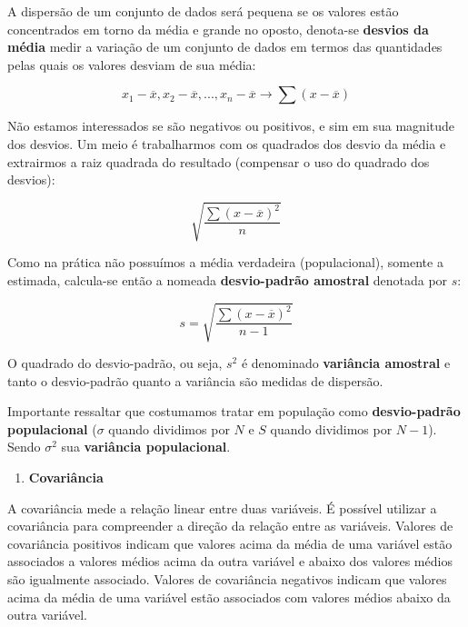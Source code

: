 \documentclass[
  openany]{book}
\providecommand{\tightlist}{%
  \setlength{\itemsep}{0pt}\setlength{\parskip}{0pt}}
\begin{document}
A dispersão de um conjunto de dados será pequena se os valores estão concentrados em torno da média e grande no oposto, denota-se \textbf{desvios da média} medir a variação de um conjunto de dados em termos das quantidades pelas quais os valores desviam de sua média:

\begin{equation}
    x_1-\overline{x},x_2-\overline{x},...,x_n-\overline{x} \rightarrow \sum(x-\overline{x})
        \label{eq:desviomedia}
\end{equation}

Não estamos interessados se são negativos ou positivos, e sim em sua magnitude dos desvios. Um meio é trabalharmos com os quadrados dos desvio da média e extrairmos a raiz quadrada do resultado (compensar o uso do quadrado dos desvios):

\begin{equation}
 \sqrt{\frac{\sum(x-\overline{x})^2}{n}}
     \label{eq:desviomedquad}
\end{equation}

Como na prática não possuímos a média verdadeira (populacional), somente a estimada, calcula-se então a nomeada \textbf{desvio-padrão amostral} denotada por \(s\):

\begin{equation}
s=\sqrt{\frac{\sum(x-\overline{x})^2}{n-1}}
    \label{eq:desviopadrao}
\end{equation}

O quadrado do desvio-padrão, ou seja, \(s^2\) é denominado \textbf{variância amostral} e tanto o desvio-padrão quanto a variância são medidas de dispersão.

Importante ressaltar que costumamos tratar em população como \textbf{desvio-padrão populacional} (\(\sigma\) quando dividimos por \(N\) e \(S\) quando dividimos por \(N-1\)). Sendo \(\sigma^2\) sua \textbf{variância populacional}.

\begin{enumerate}
\def\labelenumi{\arabic{enumi}.}
\setcounter{enumi}{3}
\tightlist
\item
  \textbf{Covariância}
\end{enumerate}

A covariância mede a relação linear entre duas variáveis. É possível utilizar a covariância para compreender a direção da relação entre as variáveis. Valores de covariância positivos indicam que valores acima da média de uma variável estão associados a valores médios acima da outra variável e abaixo dos valores médios são igualmente associado. Valores de covariância negativos indicam que valores acima da média de uma variável estão associados com valores médios abaixo da outra variável.
\end{document}
